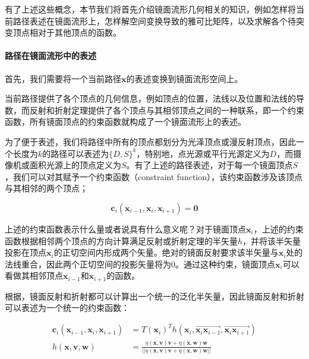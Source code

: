 有了上述这些概念，本节我们将首先介绍镜面流形几何相关的知识，例如怎样将当前路径表述在镜面流形上，怎样解空间变换导致的雅可比矩阵，以及求解各个待突变顶点相对于其他顶点的函数。




\paragraph{路径在镜面流形中的表述}
首先，我们需要将一个当前路径${\mathbf{x}}$的表述变换到镜面流形空间上。

当前路径提供了各个顶点的几何信息，例如顶点的位置，法线以及位置和法线的导数，而反射和折射定理提供了各个顶点与其相邻顶点之间的一种联系，即一个约束函数，所有镜面顶点的约束函数就构成了一个镜面流形上的表述。

为了便于表述，我们将路径中所有的顶点都划分为光泽顶点或漫反射顶点，因此一个长度为$k$的路径可以表述为$\{D,S\}^{k}$，特别地，点光源或平行光源定义为$D$，而摄像机或面积光源上的顶点定义为$S$。有了上述的路径表述，对于每一个镜面顶点$S$，我们可以对其赋予一个约束函数（constraint function），该约束函数涉及该顶点与其相邻的两个顶点；

\begin{equation}\label{e:mlt-constraint-function}
	\mathbf{c}_i(\mathbf{x}_{i-1},\mathbf{x}_i,\mathbf{x}_{i+1})=\mathbf{0}
\end{equation}

上述的约束函数表示什么量或者说具有什么意义呢？对于镜面顶点$\mathbf{x}_i$，上述的约束函数根据相邻两个顶点的方向计算满足反射或折射定理的半矢量$h$，并将该半矢量投影在顶点$\mathbf{x}_i$的正切空间内形成两个矢量。绝对的镜面反射要求该半矢量与$\mathbf{x}_i$处的法线重合，因此两个正切空间的投影矢量将为$0$。通过这种约束，镜面顶点$\mathbf{x}_i$可以看做其相邻顶点$\mathbf{x}_{i-1}$和$\mathbf{x}_{i+1}$的函数。

根据\cite{a:Microfacetmodelsforrefractionthroughroughsurfaces}，镜面反射和折射都可以计算出一个统一的泛化半矢量，因此镜面反射和折射可以表述为一个统一的约束函数：

\begin{equation}\label{e:mlt-constraint-function-and-half-vector}
\begin{aligned}
	\mathbf{c}_i(\mathbf{x}_{i-1},\mathbf{x}_i,\mathbf{x}_{i+1})&=T(\mathbf{x}_i)^{T}h(\mathbf{x}_i,\overrightarrow{\mathbf{x}_i\mathbf{x}_{i-1}},\overrightarrow{\mathbf{x}_i\mathbf{x}_{i+1}})\\
	h(\mathbf{x},\mathbf{v},\mathbf{w})&=\frac{\eta(\mathbf{x},\mathbf{v})\mathbf{v}+\eta(\mathbf{x},\mathbf{w})\mathbf{w}}{||\eta(\mathbf{x},\mathbf{v})\mathbf{v}+\eta(\mathbf{x},\mathbf{w})\mathbf{w}||}
\end{aligned}
\end{equation}

